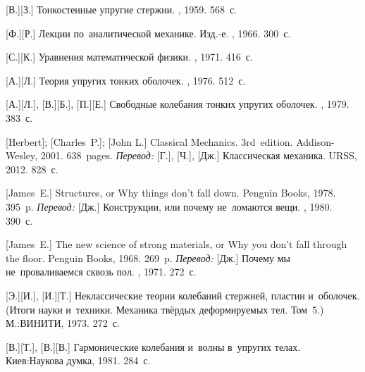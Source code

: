 \begin{thebibliography}{123}
\begin{otherlanguage}{russian}
[В.][З.] Тонкостенные упругие стержни. \fizmatgiz, 1959. 568~с.

[Ф.][Р.] Лекции по~аналитической механике. Изд.\hbox{-}е. \naukapublisher, 1966. 300~с.

[С.][К.] Уравнения математической физики. \naukapublisher, 1971. 416~с.

[А.][Л.] Теория упругих тонких оболочек. \naukapublisher, 1976. 512~с.

[А.][Л.], [В.][Б.], [П.][Е.] Свободные ко\-леба\-ния тонких упругих оболочек. \naukapublisher, 1979. 383~с.

%

[Herbert]; [Charles~P.]; [John L.] Classical Mechanics. 3rd~edition. Addison\hbox{-}Wesley, 2001. 638~pages.
\emph{Перевод:} [Г.], [Ч.], [Дж.] Классическая механика. URSS, 2012. 828~с.

[James~E.] Structures, or Why things don’t fall down. Penguin Books, 1978. 395~p.
\emph{Перевод:} [Дж.] Конструкции, или почему не~ломаются вещи. \mirpublisher, 1980. 390~с.

[James~E.] The new science of strong materials, or Why you don’t fall through the floor. Penguin Books, 1968. 269~p.
\emph{Перевод:} [Дж.] Почему мы не~проваливаемся сквозь пол. \mirpublisher, 1971. 272~с.

[Э.][И.], [И.][Т.] Неклассические теории колебаний стержней, пластин и~оболочек. (Итоги науки и~техники. Механика твёрдых деформируемых тел. Том~5.) М.:\;ВИНИТИ, 1973. 272~с.

[В.][Т.], [В.][В.] Гармонические колебания и~волны в~упругих телах. Киев:\;Наукова думка, 1981. 284~с.


\end{otherlanguage}
\end{thebibliography}
